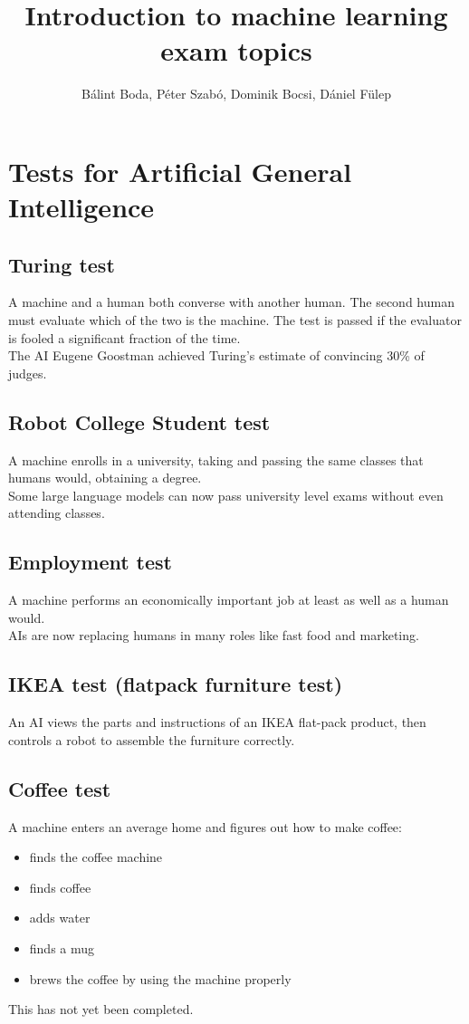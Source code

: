 \documentclass[a4paper,12pt,answers]{article}
\title{\huge{Introduction to machine learning} \\[-4pt] \large exam topics \vspace{-15pt}}
\author{Bálint Boda, Péter Szabó, Dominik Bocsi, Dániel Fülep}
\date{\vspace{-12pt}{Fall 2023}}
\begin{document}
	\maketitle
	\tableofcontents
	\newpage
	
	\section{Tests for Artificial General Intelligence}
	\subsection{Turing test}
	A machine and a human both converse with another human. The second human must evaluate which of the two is the machine.
	The test is passed if the evaluator is fooled a significant fraction of the time.
	\\[4pt]
	\noindent
	The AI Eugene Goostman achieved Turing's estimate of convincing 30\% of judges.
	
	
	\subsection{Robot College Student test }
	A machine enrolls in a university, taking and passing the same classes that humans would, obtaining a degree.
	\\[4pt]
	\noindent
	Some large language models can now pass university level exams without even attending classes.
	
	
	\subsection{Employment test}
	A machine performs an economically important job at least as well as a human would.
	\\[4pt]
	\noindent
	AIs are now replacing humans in many roles like fast food and marketing.
	
	\subsection{IKEA test (flatpack furniture test)}
	An AI views the parts and instructions of an IKEA flat-pack product, then controls a robot to assemble the furniture correctly.
	
	
	\subsection{Coffee test}
	A machine enters an average home and figures out how to make coffee:
	\begin{itemize}
		\item finds the coffee machine
		\item finds coffee
		\item adds water
		\item finds a mug
		\item brews the coffee by using the machine properly
	\end{itemize}
	\noindent
	This has not yet been completed.
	\newpage
	
\end{document}
